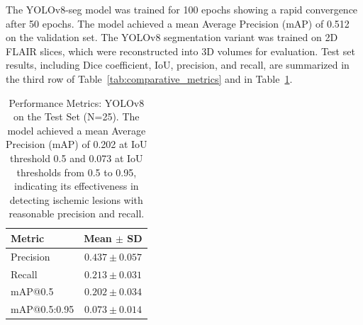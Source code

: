 \documentclass[12pt]{article}
\begin{document}

The YOLOv8-seg model was trained for 100 epochs %
showing a rapid convergence after 50 epochs. The model achieved a mean Average Precision (mAP) of 0.512 on the validation set. The YOLOv8 segmentation variant was trained on 2D FLAIR slices, which were reconstructed into 3D volumes for evaluation. Test set results, including Dice coefficient, IoU, precision, and recall, are summarized in the third row of Table~\ref{tab:comparative_metrics} and in Table~\ref{tab:yolov8_detection_metrics}.
%
%
%
\begin{table}[tp]
\centering
\begin{tabular}{lc}
\toprule
Metric & Mean $\pm$ SD \\
\midrule
Precision & $0.437 \pm 0.057$ \\
Recall & $0.213 \pm 0.031$ \\
mAP@0.5 & $0.202 \pm 0.034$ \\
mAP@0.5:0.95 & $0.073 \pm 0.014$ \\
\bottomrule
\end{tabular}
\caption{Performance Metrics: YOLOv8 on the Test Set (N=25). The model achieved a mean Average Precision (mAP) of 0.202 at IoU threshold 0.5 and 0.073 at IoU thresholds from 0.5 to 0.95, indicating its effectiveness in detecting ischemic lesions with reasonable precision and recall.}\label{tab:yolov8_detection_metrics}
\end{table}
\end{document}
